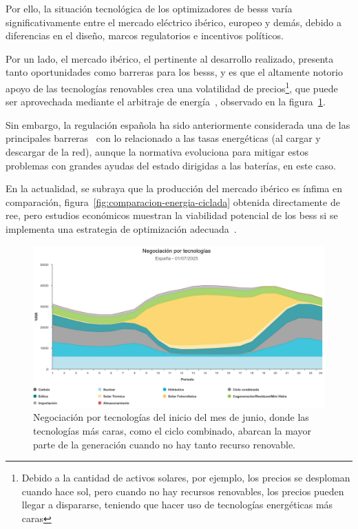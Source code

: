 Por ello, la situación tecnológica de los optimizadores de \glspl{bess} varía significativamente entre el mercado eléctrico ibérico, europeo y demás, debido a diferencias en el diseño, marcos regulatorios e incentivos políticos.

Por un lado, el mercado ibérico, el pertinente al desarrollo realizado, presenta tanto oportunidades como barreras para los \glspl{bess}, y es que el altamente notorio apoyo de las tecnologías renovables crea una volatilidad de precios\footnote{Debido a la cantidad de activos solares, por ejemplo, los precios se desploman cuando hace sol, pero cuando no hay recursos renovables, los precios pueden llegar a dispararse, teniendo que hacer uso de tecnologías energéticas más caras}, que puede ser aprovechada mediante el arbitraje de energía~\cite{hu2022potential}, observado en la figura~\ref{fig:arbitraje-tecnologia}.

Sin embargo, la regulación española ha sido anteriormente considerada una de las principales barreras~\cite{hu2021barriers} con lo relacionado a las tasas energéticas (al cargar y descargar de la red), aunque la normativa evoluciona para mitigar estos problemas con grandes ayudas del estado dirigidas a las baterías, en este caso.

En la actualidad, se subraya que la producción del mercado ibérico es ínfima en comparación, figura~\ref{fig:comparacion-energia-ciclada} obtenida directamente de \gls{ree}, pero estudios económicos muestran la viabilidad potencial de los \gls{bess} si se implementa una estrategia de optimización adecuada~\cite{he2015optimal}.

\begin{figure}
  \centering
  \includegraphics[width=0.75\linewidth]{figures/arbitraje-tecnologia.jpg}
  \caption{Negociación por tecnologías del inicio del mes de junio, donde las tecnologías más caras, como el ciclo combinado, abarcan la mayor parte de la generación cuando no hay tanto recurso renovable.}
  \label{fig:arbitraje-tecnologia}
\end{figure}

